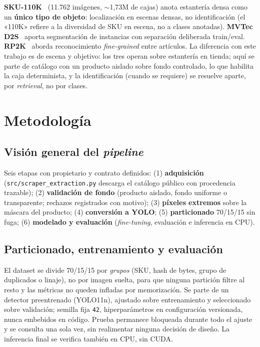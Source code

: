 \documentclass[10pt,a4paper]{article}
\begin{document}
\textbf{SKU-110K}~\cite{goldman2019} (11.762 imágenes, $\sim$1,73M de cajas)
anota estantería densa como un \textbf{único tipo de objeto}: localización en
escenas densas, no identificación (el «110K» refiere a la diversidad de SKU
en escena, no a clases anotadas). \textbf{MVTec D2S}~\cite{mvtecd2s} aporta
segmentación de instancias con separación deliberada train/eval.
\textbf{RP2K}~\cite{peng2020} aborda reconocimiento \emph{fine-grained} entre
artículos. La diferencia con este trabajo es de escena y objetivo: los tres
operan sobre estantería en tienda; aquí se parte de catálogo con un producto
aislado sobre fondo controlado, lo que habilita la caja determinista, y la
identificación (cuando se requiere) se resuelve aparte, por
\emph{retrieval}, no por clases.


\section{Metodología}

\subsection{Visión general del \emph{pipeline}}

Seis etapas con propietario y contrato definidos: (1) \textbf{adquisición}
(\texttt{src/scraper\_extraction.py} descarga el catálogo público con
procedencia trazable); (2) \textbf{validación de fondo} (producto aislado,
fondo uniforme o transparente; rechazos registrados con motivo);
(3) \textbf{píxeles extremos} sobre la máscara del producto;
(4) \textbf{conversión a YOLO}; (5) \textbf{particionado} 70/15/15 sin fuga;
(6) \textbf{modelado y evaluación} (\emph{fine-tuning}, evaluación e
inferencia en CPU).

\subsection{Particionado, entrenamiento y evaluación}

El dataset se divide 70/15/15 por \emph{grupos} (SKU, hash de bytes, grupo de
duplicados o linaje), no por imagen suelta, para que ninguna partición filtre
al resto y las métricas no queden infladas por memorización. Se parte de un
detector preentrenado (YOLO11n), ajustado sobre entrenamiento y seleccionado
sobre validación; semilla fija \texttt{42}, hiperparámetros en configuración
versionada, nunca embebidos en código. Prueba permanece bloqueada durante todo
el ajuste y se consulta una sola vez, sin realimentar ninguna decisión de
diseño. La inferencia final se verifica también en CPU, sin CUDA.
\end{document}
